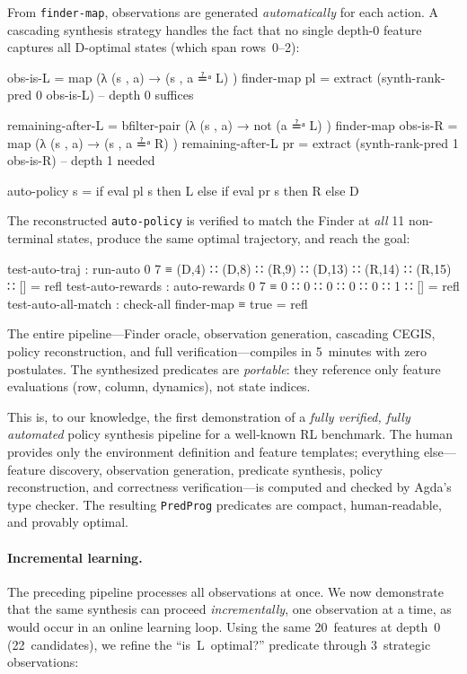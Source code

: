 \noindent From \texttt{finder-map}, observations are generated \emph{automatically} for each action.  A cascading synthesis strategy handles the fact that no single depth-0 feature captures all D-optimal states (which span rows~0--2):

\begin{spec}
obs-is-L = map (λ { (s , a) → (s , a ≟ᵃ L) }) finder-map
pl       = extract (synth-rank-pred 0 obs-is-L)          -- depth 0 suffices

remaining-after-L = bfilter-pair (λ { (s , a) → not (a ≟ᵃ L) }) finder-map
obs-is-R = map (λ { (s , a) → (s , a ≟ᵃ R) }) remaining-after-L
pr       = extract (synth-rank-pred 1 obs-is-R)          -- depth 1 needed

auto-policy s = if eval pl s then L else if eval pr s then R else D
\end{spec}

\noindent The reconstructed \texttt{auto-policy} is verified to match the Finder at \emph{all} 11 non-terminal states, produce the same optimal trajectory, and reach the goal:

\begin{spec}
test-auto-traj : run-auto 0 7
  ≡ (D,4) ∷ (D,8) ∷ (R,9) ∷ (D,13) ∷ (R,14) ∷ (R,15) ∷ []   = refl
test-auto-rewards : auto-rewards 0 7 ≡ 0 ∷ 0 ∷ 0 ∷ 0 ∷ 0 ∷ 1 ∷ [] = refl
test-auto-all-match : check-all finder-map ≡ true                     = refl
\end{spec}

\noindent The entire pipeline---Finder oracle, observation generation, cascading CEGIS, policy reconstruction, and full verification---compiles in 5~minutes with zero postulates.  The synthesized predicates are \emph{portable}: they reference only feature evaluations (row, column, dynamics), not state indices.

\begin{remark}
This is, to our knowledge, the first demonstration of a \emph{fully verified, fully automated} policy synthesis pipeline for a well-known RL benchmark.  The human provides only the environment definition and feature templates; everything else---feature discovery, observation generation, predicate synthesis, policy reconstruction, and correctness verification---is computed and checked by Agda's type checker.  The resulting \texttt{PredProg} predicates are compact, human-readable, and provably optimal.
\end{remark}

\paragraph{Incremental learning.}
The preceding pipeline processes all observations at once.  We now demonstrate that the same synthesis can proceed \emph{incrementally}, one observation at a time, as would occur in an online learning loop.  Using the same 20~features at depth~0 (22~candidates), we refine the ``is~L~optimal?'' predicate through 3~strategic observations:

